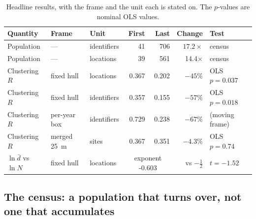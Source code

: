 \documentclass[fleqn,10pt,lineno]{wlpeerj}
\newcommand{\nFirst}{41}
\newcommand{\nLast}{706}
\newcommand{\growth}{17.2}
\newcommand{\rFirst}{0.729}
\newcommand{\rLast}{0.238}
\newcommand{\rDrop}{67}
\newcommand{\growthLoc}{14.4}
\newcommand{\cleanSlopeLoc}{-0.603}
\newcommand{\cleanTLoc}{-1.52}
\newcommand{\hullLocOlsP}{0.037}
\newcommand{\hullIdsOlsP}{0.018}
\newcommand{\locHullDrop}{45}
\newcommand{\rHullFirst}{0.357}
\newcommand{\rHullLast}{0.155}
\newcommand{\rHullDrop}{57}
\newcommand{\rHullLocFirst}{0.367}
\newcommand{\rHullLocLast}{0.202}
\begin{document}
\begin{table}[htbp]
\centering
\caption{Headline results, with the frame and the unit each is stated on. The $p$-values are nominal OLS values.}
\label{tab:summary}
\small
\setlength{\tabcolsep}{4pt}
\begin{tabular}{lllrrrl}
\toprule
Quantity & Frame & Unit & First & Last & Change & Test \\
\midrule
Population & --- & identifiers & \nFirst & \nLast & $\growth\times$ & census \\
Population & --- & locations & 39 & 561 & \growthLoc$\times$ & census \\
Clustering $R$ & fixed hull & locations & \rHullLocFirst & \rHullLocLast & $-\locHullDrop\%$ & OLS $p=\hullLocOlsP$ \\
Clustering $R$ & fixed hull & identifiers & \rHullFirst & \rHullLast & $-\rHullDrop\%$ & OLS $p=\hullIdsOlsP$ \\
Clustering $R$ & per-year box & identifiers & \rFirst & \rLast & $-\rDrop\%$ & (moving frame) \\
Clustering $R$ & merged \SI{25}{\meter} & sites & 0.367 & 0.351 & $-\num{4.3}\%$ & OLS $p = 0.74$ \\
$\ln\bar{d}$ vs $\ln N$ & fixed hull & locations & \multicolumn{2}{c}{exponent \cleanSlopeLoc} & vs $-\tfrac12$ & $t = \cleanTLoc$ \\
\bottomrule
\end{tabular}
\end{table}

\subsection*{The census: a population that turns over, not one that accumulates}
\label{sec:results-population}
\end{document}
